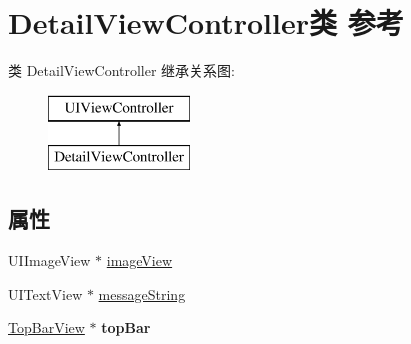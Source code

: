 \hypertarget{interface_detail_view_controller}{\section{Detail\-View\-Controller类 参考}
\label{interface_detail_view_controller}
}
类 Detail\-View\-Controller 继承关系图\-:\begin{figure}[H]
\begin{center}
\leavevmode
\includegraphics[height=2.000000cm]{interface_detail_view_controller}
\end{center}
\end{figure}
\subsection*{属性}
\begin{DoxyCompactItemize}
\item 
U\-I\-Image\-View $\ast$ \hyperlink{interface_detail_view_controller_abbfe3bd7006a8d1bc65ab912baba010c}{image\-View}
\item 
U\-I\-Text\-View $\ast$ \hyperlink{interface_detail_view_controller_a3dc13cf075c44441185fc0f91e363607}{message\-String}
\item 
\hypertarget{interface_detail_view_controller_afb801097cbef8f865adaffba99e24fc3}{\hyperlink{interface_top_bar_view}{Top\-Bar\-View} $\ast$ {\bfseries top\-Bar}}\label{interface_detail_view_controller_afb801097cbef8f865adaffba99e24fc3}

\end{DoxyCompactItemize}


